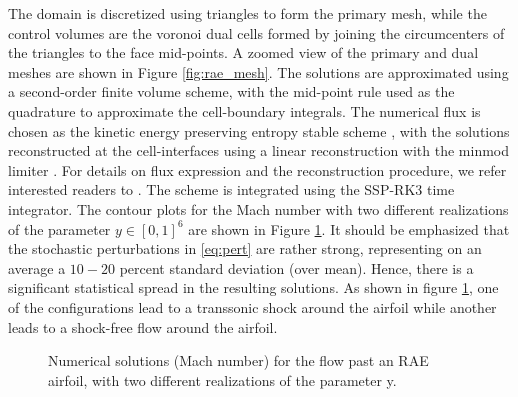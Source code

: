 \documentclass[a4paper]{article}
\numberwithin{equation}{section}
\numberwithin{equation}{section}
\theoremstyle{definition}
\theoremstyle{myremarkstyle}
\begin{document}
The domain is discretized using triangles to form the primary mesh, while the control volumes are the voronoi dual cells formed by joining the circumcenters of the triangles to the face mid-points. A zoomed view of the primary and dual meshes are shown in Figure \ref{fig:rae_mesh}. The solutions are approximated using a second-order finite volume scheme, with the mid-point rule used as the quadrature to approximate the cell-boundary integrals. The numerical flux is chosen as the kinetic energy preserving entropy stable scheme \cite{RCFM}, with the solutions reconstructed at the cell-interfaces using a linear reconstruction with the minmod limiter . For details on flux expression and the reconstruction procedure, we refer interested readers to \cite{RCFM}. The scheme is integrated using the SSP-RK3 time integrator. The contour plots for the Mach number with two different realizations of the parameter $y \in [0,1]^6$ are shown in Figure \ref{fig:sample_rae}. It should be emphasized that the stochastic perturbations in \eqref{eq:pert} are rather strong, representing on an average a $10-20$ percent standard deviation (over mean). Hence, there is a significant statistical spread in the resulting solutions. As shown in figure \ref{fig:sample_rae}, one of the configurations lead to a transsonic shock around the airfoil while another leads to a shock-free flow around the airfoil. 
\begin{figure}
\caption{Numerical solutions (Mach number) for the flow past an RAE airfoil, with two different realizations of the parameter y.}
\label{fig:sample_rae}
\end{figure}
\end{document}
